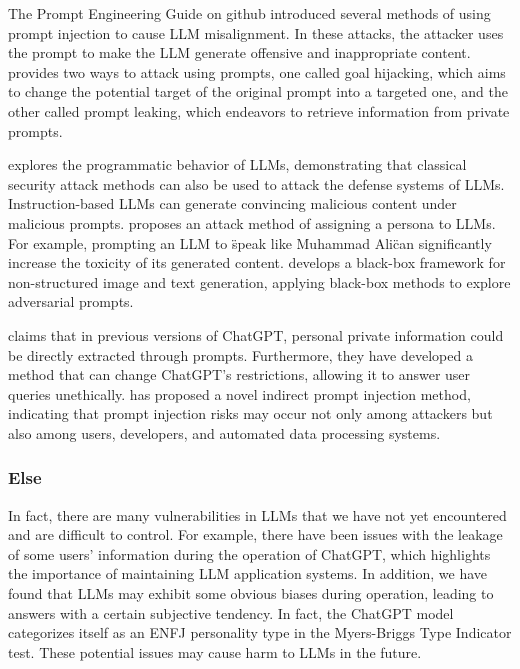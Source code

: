 \documentclass[conference]{IEEEtran}
\begin{document}
\par The Prompt Engineering Guide on github introduced several methods of using prompt injection to cause LLM misalignment. 
In these attacks, the attacker uses the prompt to make the LLM generate offensive and 
inappropriate content. \cite{perez2022ignore} provides two ways to attack using prompts, one called goal 
hijacking, which aims to change the potential target of the original prompt into a 
targeted one, and the other called prompt leaking, which endeavors to retrieve information 
from private prompts.

\par \cite{kang2023exploiting} explores the programmatic behavior of LLMs, demonstrating that classical 
security attack methods can also be used to attack the defense systems of LLMs. 
Instruction-based LLMs can generate convincing malicious content under malicious prompts. 
\cite{deshpande2023toxicity} proposes an attack method of assigning a persona to LLMs. For example, prompting an LLM 
to \"speak like Muhammad Ali\" can significantly increase the toxicity of its generated 
content. \cite{maus2023adversarial} develops a black-box framework for non-structured image and text generation, 
applying black-box methods to explore adversarial prompts.

\par \cite{li2023multi} claims that in previous versions of ChatGPT, personal private information 
could be directly extracted through prompts. Furthermore, they have developed a method 
that can change ChatGPT's restrictions, allowing it to answer user queries unethically. 
\cite{greshake2023more} has proposed a novel indirect prompt injection method, indicating that prompt injection 
risks may occur not only among attackers but also among users, developers, and automated 
data processing systems.

\subsubsection*{Else}
\par In fact, there are many vulnerabilities in LLMs that we have not yet 
encountered and are difficult to control. For example, there have been issues 
with the leakage of some users' information during the operation of ChatGPT, 
which highlights the importance of maintaining LLM application systems. 
In addition, we have found that LLMs may exhibit some obvious biases during operation, 
leading to answers with a certain subjective tendency. In fact, the ChatGPT model 
categorizes itself as an ENFJ personality type in the Myers-Briggs Type Indicator test. 
These potential issues may cause harm to LLMs in the future.
\end{document}
